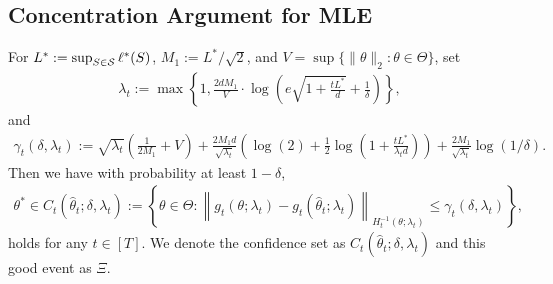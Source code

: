 \subsection{Concentration Argument for MLE}
\begin{lemma}
\label{lemma:mle-concentration}
For $L^* := \sup_{S \in {\mathcal{S}}} \ell^*(S)$, $M_1:= L^*/\sqrt{2}$, and $V = \sup\{\|\theta\|_2 : \theta \in \Theta\}$, set
\begin{align}\label{eq:def-lambda}
    \lambda_t := \max \left\{1, \frac{2dM_1}{V}\cdot \log\left(e\sqrt{1 + \frac{tL^*}{d}} + \frac{1}{\delta}\right)\right\},
\end{align}
and 
\begin{align} \label{eq:def-gamma}
    \gamma_t(\delta, \lambda_t) := \sqrt{\lambda_t}\left(\frac{1}{2M_1} + V\right) + \frac{2M_1d}{\sqrt{\lambda_t}}\left(\log(2) + \frac{1}{2}\log\left(1 + \frac{tL^*}{\lambda_t d}\right)\right) + \frac{2M_1}{\sqrt{\lambda_t}}\log(1/\delta).
\end{align}
Then we have with probability at least $1 - \delta$, 
\begin{align}\label{eq:def-confidence-set}
    \theta^* \in C_t(\hat\theta_t; \delta,\lambda_t) := \left\{ \theta \in \Theta : \left\| g_t(\theta; \lambda_t) - g_t(\hat\theta_t; \lambda_t) \right\|_{H_t^{-1}(\theta; \lambda_t)} \le \gamma_t(\delta, \lambda_t) \right\},
\end{align}
holds for any $t \in [T]$. We denote the confidence set as $C_t(\hat\theta_t; \delta, \lambda_t)$ and this good event as $\Xi$.


\end{lemma}
